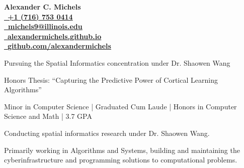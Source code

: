 \documentclass{acmresume}
\begin{document}
	
	\begin{multicols}{2}
		\vspace*{.1cm}
		\textbf{\Huge Alexander C. Michels}\\ \columnbreak
        \hfill\href{tel:17167530414}{\faPhone~\textbf{+1 (716) 753 0414}} \\
        \hfill\href{mailto:alexandercm4297@gmail.com}{\textbf{\faEnvelope~michels9@illinois.edu}} \\
        \hfill\href{http://alexandermichels.github.io}{\faGlobeAmericas~\textbf{alexandermichels.github.io}} \\
        \hfill\href{https://github.com/alexandermichels}{\faGithub~\textbf{github.com/alexandermichels}}
	\end{multicols}
	
	
		\begin{titemize}
			\item{Pursuing the Spatial Informatics concentration under Dr. Shaowen Wang}
		\end{titemize}

        \begin{titemize}
            \item Honors Thesis: ``Capturing the Predictive Power of Cortical Learning Algorithms''
            \item{Minor in Computer Science | Graduated Cum Laude | Honors in Computer Science and Math | 3.7 GPA}
        \end{titemize}
	
	
        \begin{titemize}
            \item Conducting spatial informatics research under Dr. Shaowen Wang.
            \item Primarily working in Algorithms and Systems, building and maintaining the cyberinfrastructure and programming solutions to computational problems.
        \end{titemize}
		
\end{document}
